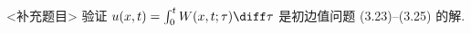 


\begin{exercise}[7]<补充题目>
  验证 $u(x,t) = \int_0^t W(x,t;\tau)\diff\tau$ 是初边值问题 (3.23)--(3.25) 的解.
\end{exercise}

